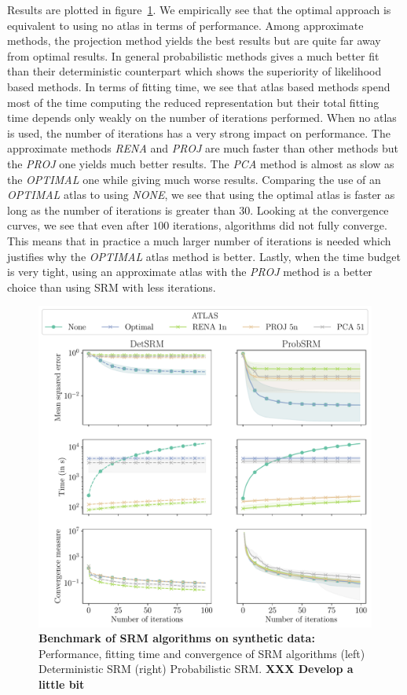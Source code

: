 Results are plotted in figure~\ref{fig:srm:synthetic_gradient}. 
We empirically see that the optimal approach is equivalent to using no atlas in
terms of performance. Among approximate methods, the projection
method yields the best results but are quite far away from optimal results.
In general probabilistic methods gives a much better fit than their deterministic
counterpart which shows the superiority of likelihood based methods.
In terms of fitting time, we see that atlas based methods spend most of the time
computing the reduced representation but their total fitting time depends only
weakly on the number of iterations performed. When no atlas is used, the number
of iterations has a very strong impact on performance. The approximate methods
\emph{RENA} and \emph{PROJ} are much faster than other methods but
the \emph{PROJ} one yields much better results. The \emph{PCA} method is
almost as slow as the \emph{OPTIMAL} one while giving much worse results.
Comparing the use of an \emph{OPTIMAL} atlas to using \emph{NONE}, we see that
using the optimal atlas is faster as long as the number of iterations is greater
than $30$.
Looking at the convergence curves, we see that even after $100$ iterations, algorithms did
not fully converge. This means that in practice a much larger number of
iterations is needed which justifies why the \emph{OPTIMAL} atlas method is better.
Lastly, when the time budget is very tight, using an approximate atlas with the
\emph{PROJ} method is a better choice than
using SRM with less iterations. 

\begin{figure}
  \centering
  \includegraphics[width=\textwidth]{figures/srm/synthetic_gradient.pdf}
  \caption{\textbf{Benchmark of SRM algorithms on synthetic data: } Performance,
    fitting time and convergence of SRM algorithms (left) Deterministic SRM
    (right) Probabilistic SRM. \textbf{XXX Develop a little bit}}
  \label{fig:srm:synthetic_gradient}
\end{figure}





